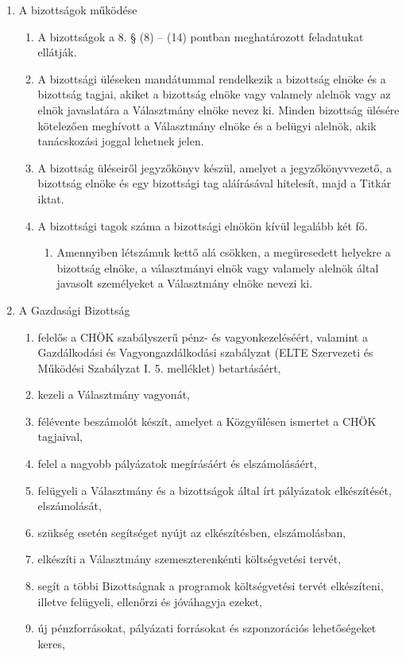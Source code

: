 \documentclass{rulebook}
\begin{document}
\begin{enumerate}
	\item  A bizottságok működése
		\begin{enumerate}	
		\item A bizottságok a 8. § (8) – (14) pontban meghatározott feladatukat ellátják.
		\item A bizottsági üléseken mandátummal rendelkezik a bizottság elnöke és a bizottság tagjai, akiket a bizottság elnöke vagy valamely alelnök vagy az elnök javaslatára a Választmány elnöke nevez ki. Minden bizottság ülésére kötelezően meghívott a Választmány elnöke és a belügyi alelnök, akik tanácskozási joggal lehetnek jelen.
		\item A bizottság üléseiről jegyzőkönyv készül, amelyet a jegyzőkönyvvezető, a bizottság elnöke és egy bizottsági tag aláírásával hitelesít, majd a Titkár iktat.
		\item A bizottsági tagok száma a bizottsági elnökön kívül legalább két fő. 
			\begin{enumerate}	
			\item Amennyiben létszámuk kettő alá csökken, a megüresedett helyekre a bizottság elnöke, a választmányi elnök vagy valamely alelnök által javasolt személyeket a Választmány elnöke nevezi ki.
			\end{enumerate}
		\end{enumerate}
	\item  A Gazdasági Bizottság
	\begin{enumerate}	
		\item  felelős a CHÖK szabályszerű pénz- és vagyonkezeléséért, valamint a Gazdálkodási és Vagyongazdálkodási szabályzat (ELTE Szervezeti és Működési Szabályzat I. 5. melléklet) betartásáért,
		\item  kezeli a Választmány vagyonát,
		\item  félévente beszámolót készít, amelyet a Közgyűlésen ismertet a CHÖK tagjaival,
		\item  felel a nagyobb pályázatok megírásáért és elszámolásáért,
		\item  felügyeli a Választmány és a bizottságok által írt pályázatok elkészítését, elszámolását,
		\item  szükség esetén segítséget nyújt az elkészítésben, elszámolásban,
		\item  elkészíti a Választmány szemeszterenkénti költségvetési tervét,
		\item  segít a többi Bizottságnak a programok költségvetési tervét elkészíteni, illetve felügyeli, ellenőrzi és jóváhagyja ezeket,
		\item  új pénzforrásokat, pályázati forrásokat és szponzorációs lehetőségeket keres,

\end{enumerate}
\end{enumerate}
\end{document}
